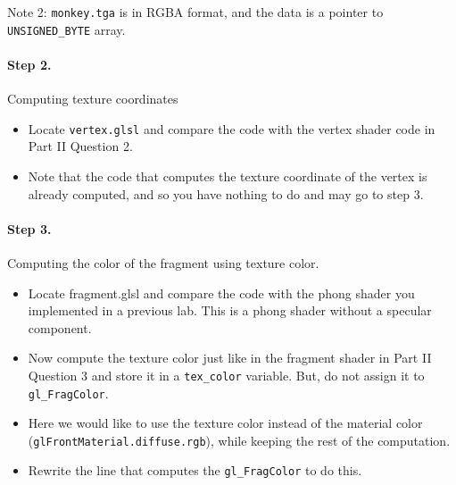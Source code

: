 \documentclass[12pt]{article}
\begin{document}
Note 2: \texttt{monkey.tga} is in RGBA format, and the data is a pointer to
\texttt{UNSIGNED\_BYTE} array.

\paragraph*{Step 2.} Computing texture coordinates

\begin{itemize}
\item Locate \texttt{vertex.glsl} and compare the code with the vertex shader
  code in Part II Question 2.
\item Note that the code that computes the texture coordinate of the vertex is
  already computed, and so you have nothing to do and may go to step 3.
\end{itemize}

\paragraph*{Step 3.} Computing the color of the fragment using texture color. 

\begin{itemize}
\item Locate fragment.glsl and compare the code with the phong shader you
  implemented in a previous lab. This is a phong shader without a
  specular component.
\item Now compute the texture color just like in the fragment shader in
  Part II Question 3 and store it in a \texttt{tex\_color} variable. But, do not
  assign it to \texttt{gl\_FragColor}.
\item Here we would like to use the texture color instead of the material
  color \\
(\texttt{glFrontMaterial.diffuse.rgb}), while keeping the rest of the
  computation. 
\item Rewrite the line that computes the \texttt{gl\_FragColor} to do this.
\end{itemize}
\end{document}
